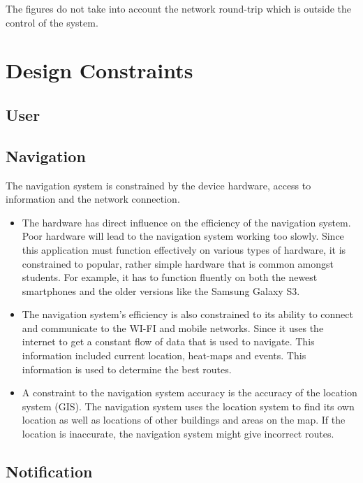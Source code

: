 \documentclass[runningheads,a4paper]{article}
\begin{document}
The figures do not take into account the network round-trip which is outside the control of the
system.

\section{Design Constraints}

\subsection{User}
\subsection{Navigation}

The navigation system is constrained by the device hardware, access to information and the network connection.

\begin{itemize}
\item The hardware has direct influence on the efficiency of the navigation system. Poor hardware will lead to the navigation system working too slowly. Since this application must function effectively on various types of hardware, it is constrained to popular, rather simple hardware that is common amongst students. For example, it has to function fluently on both the newest smartphones and the older versions like the Samsung Galaxy S3.

\item The navigation system’s efficiency is also constrained to its ability to connect and communicate to the WI-FI and mobile networks. Since it uses the internet to get a constant flow of data that is used to navigate. This information included current location, heat-maps and events. This information is used to determine the best routes.

\item A constraint to the navigation system accuracy is the accuracy of the location system (GIS). The navigation system uses the location system to find its own location as well as locations of other buildings and areas on the map. If the location is inaccurate, the navigation system might give incorrect routes. 

\end{itemize}

\subsection{Notification}
\end{document}
